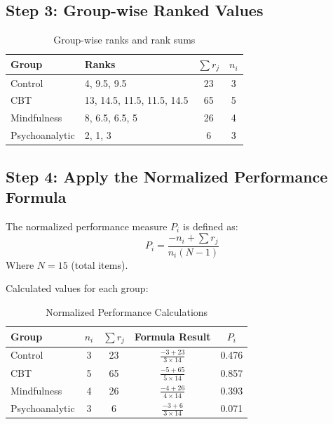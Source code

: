 \documentclass[a4paper,fleqn,review]{cas-sc}
\begin{document}
\subsection*{Step 3: Group-wise Ranked Values}

\begin{table}[!hbtp]
	\centering
	\renewcommand{\arraystretch}{1.3}
	\begin{tabular}{|l|l|c|c|}
		\hline
		\textbf{Group} & \textbf{Ranks} & $\sum r_j$ & $n_i$ \\
		\hline
		Control & 4, 9.5, 9.5 & 23 & 3 \\
		CBT & 13, 14.5, 11.5, 11.5, 14.5 & 65 & 5 \\
		Mindfulness & 8, 6.5, 6.5, 5 & 26 & 4 \\
		Psychoanalytic & 2, 1, 3 & 6 & 3 \\
		\hline
	\end{tabular}
	\caption{Group-wise ranks and rank sums}
\end{table}

\vspace{1em}

\subsection*{Step 4: Apply the Normalized Performance Formula}

The normalized performance measure $P_i$ is defined as:
\[
P_i = \frac{-n_i + \sum r_j}{n_i (N - 1)}
\]
Where $N = 15$ (total items).

\vspace{0.5em}

\noindent Calculated values for each group:

\begin{table}[!hbtp]
	\centering
	\renewcommand{\arraystretch}{1.3}
	\begin{tabular}{|l|c|c|c|c|}
		\hline
		\textbf{Group} & $n_i$ & $\sum r_j$ & Formula Result & $P_i$ \\
		\hline
		Control & 3 & 23 & $\frac{-3 + 23}{3 \times 14}$ & 0.476 \\
		CBT & 5 & 65 & $\frac{-5 + 65}{5 \times 14}$ & 0.857 \\
		Mindfulness & 4 & 26 & $\frac{-4 + 26}{4 \times 14}$ & 0.393 \\
		Psychoanalytic & 3 & 6 & $\frac{-3 + 6}{3 \times 14}$ & 0.071 \\
		\hline
	\end{tabular}
	\caption{Normalized Performance Calculations}
\end{table}
\end{document}
